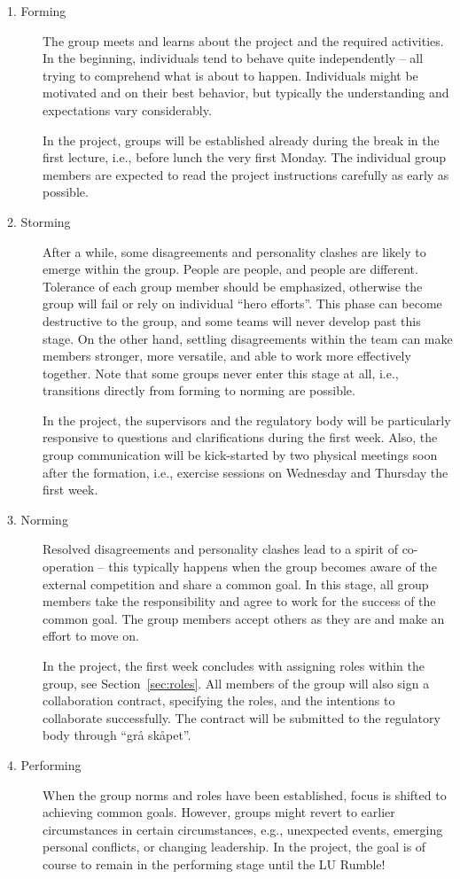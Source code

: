 \documentclass{scrreprt}
\begin{document}
\begin{description}
\item[1. Forming] The group meets and learns about the project and the required activities. In the beginning, individuals tend to behave quite independently -- all trying to comprehend what is about to happen. Individuals might be motivated and on their best behavior, but typically the understanding and expectations vary considerably. 

In the project, groups will be established already during the break in the first lecture, i.e., before lunch the very first Monday. The individual group members are expected to read the project instructions carefully as early as possible.
\item[2. Storming] After a while, some disagreements and personality clashes are likely to emerge within the group. People are people, and people are different. Tolerance of each group member should be emphasized, otherwise the group will fail or rely on individual ``hero efforts''. This phase can become destructive to the group, and some teams will never develop past this stage. On the other hand, settling disagreements within the team can make members stronger, more versatile, and able to work more effectively together. Note that some groups never enter this stage at all, i.e., transitions directly from forming to norming are possible.

In the project, the supervisors and the regulatory body will be particularly responsive to questions and clarifications during the first week. Also, the group communication will be kick-started by two physical meetings soon after the formation, i.e., exercise sessions on Wednesday and Thursday the first week.

\item[3. Norming] Resolved disagreements and personality clashes lead to a spirit of co-operation -- this typically happens when the group becomes aware of the external competition and share a common goal. In this stage, all group members take the responsibility and agree to work for the success of the common goal. The group members accept others as they are and make an effort to move on. 

In the project, the first week concludes with assigning roles within the group, see Section~\ref{sec:roles}. All members of the group will also sign a collaboration contract, specifying the roles, and the intentions to collaborate successfully. The contract will be submitted to the regulatory body through ``grå skåpet''.
\item[4. Performing] When the group norms and roles have been established, focus is shifted to achieving common goals. However, groups might revert to earlier circumstances in certain circumstances, e.g., unexpected events, emerging personal conflicts, or changing leadership. In the project, the goal is of course to remain in the performing stage until the LU Rumble!
\end{description}
\end{document}
